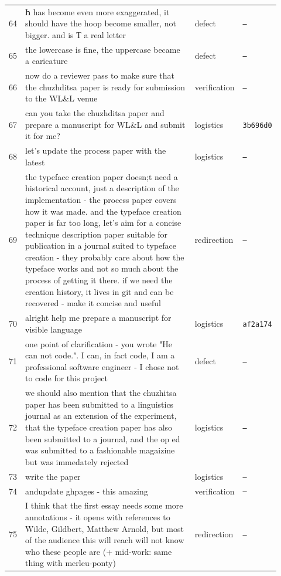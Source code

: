 \begin{longtable}{@{}p{0.04\linewidth}p{0.66\linewidth}p{0.13\linewidth}p{0.09\linewidth}@{}}
64 & Һ has become even more exaggerated, it should have the hoop become smaller, not bigger. and is Т a real letter & defect & \texttt{—} \\
65 & the lowercase is fine, the uppercase became a caricature & defect & \texttt{—} \\
66 & now do a reviewer pass to make sure that the chuzhditsa paper is ready for submission to the WL\&L venue & verification & \texttt{—} \\
67 & can you take the chuzhditsa paper and prepare a manuscript for WL\&L and submit it for me? & logistics & \texttt{3b696d0} \\
68 & let's update the process paper with the latest & logistics & \texttt{—} \\
69 & the typeface creation paper doesn;t need a historical account, just a description of the implementation - the process paper covers how it was made. and the typeface creation paper is far too long, let's aim for a concise technique description paper suitable for publication in a journal suited to typeface creation - they probably care about how the typeface works and not so much about the process of getting it there. if we need the creation history, it lives in git and can be recovered - make it concise and useful & redirection & \texttt{—} \\
70 & alright help me prepare a manuscript for visible language & logistics & \texttt{af2a174} \\
71 & one point of clarification - you wrote "He can not code.". I can, in fact code, I am a professional software engineer - I chose not to code for this project & defect & \texttt{—} \\
72 & we should also mention that the chuzhitsa paper has been submitted to a linguistics journal as an extension of the experiment, that the typeface creation paper has also been submitted to a journal, and the op ed was submitted to a fashionable magaizine but was immedately rejected & logistics & \texttt{—} \\
73 & write the paper & logistics & \texttt{—} \\
74 & andupdate ghpages - this amazing & verification & \texttt{—} \\
75 & I think that the first essay needs some more annotations - it opens with references to Wilde, Gildbert, Matthew Arnold, but most of the audience this will reach will not know who these people are (+ mid-work: same thing with merleu-ponty) & redirection & \texttt{—} \\

\end{longtable}
